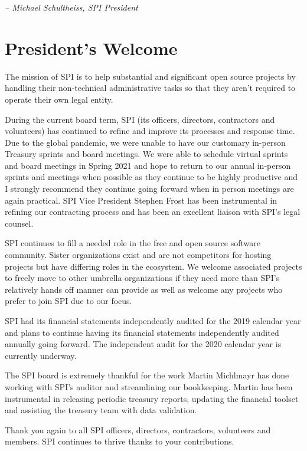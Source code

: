 \documentclass[a4paper]{report}
\begin{document}
  \emph{-- Michael Schultheiss, SPI President}

\newpage

\tableofcontents

\newpage

\chapter{President's Welcome}
\label{sec:president}

The mission of SPI is to help substantial and significant open source
projects by handling their non-technical administrative tasks so that
they aren't required to operate their own legal entity.

During the current board term, SPI (its officers, directors, contractors and
volunteers) has continued to refine and improve its processes and response
time.  Due to the global pandemic, we were unable to have our customary
in-person Treasury sprints and board meetings. We were able to schedule virtual
sprints and board meetings in Spring 2021 and hope to return to our annual
in-person sprints and meetings when possible as they continue to be highly
productive and I strongly recommend they continue going forward when in person
meetings are again practical. SPI Vice President Stephen Frost has been
instrumental in refining our contracting process and has been an excellent
liaison with SPI's legal counsel.

SPI continues to fill a needed role in the free and open source software
community. Sister organizations exist and are not competitors for
hosting projects but have differing roles in the ecosystem. We welcome
associated projects to freely move to other umbrella organizations if
they need more than SPI's relatively hands off manner can provide as
well as welcome any projects who prefer to join SPI due to our focus.

SPI had its financial statements independently audited for the 2019 calendar
year and plans to continue having its financial statements independently
audited annually going forward. The independent audit for the 2020 calendar
year is currently underway.

The SPI board is extremely thankful for the work Martin Michlmayr has
done working with SPI's auditor and streamlining our bookkeeping. Martin
has been instrumental in releasing periodic treasury reports, updating
the financial toolset and assisting the treasury team with data
validation.

Thank you again to all SPI officers, directors, contractors, volunteers
and members. SPI continues to thrive thanks to your contributions.
\end{document}
